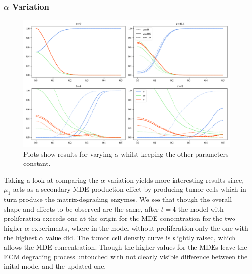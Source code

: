 \subsubsection*{$\alpha$ Variation}
\begin{figure}[h!]
    \centering
    \includegraphics[width=\textwidth]{resources/images/prolif_alpha_variation.png}
    \caption{Plots show results for varying $\alpha$ whilst keeping the other parameters constant.}
    \label{fig:prolif_alpha_variation}
\end{figure}

Taking a look at comparing the $\alpha$-variation yields more interesting results since, $\mu_1$ acts as a secondary MDE production effect by producing tumor cells which in turn produce the matrix-degrading enzymes. We see that though the overall shape and effects to be observed are the same, after $t=4$ the model with proliferation exceeds one at the origin for the MDE concentration for the two higher $\alpha$ experiments, where in the model without proliferation only the one with the highest $\alpha$ value did. The tumor cell denstiy curve is slightly raised, which allows the MDE concentration. Though the higher values for the MDEs leave the ECM degrading process untouched with not clearly visible difference between the inital model and the updated one. 

